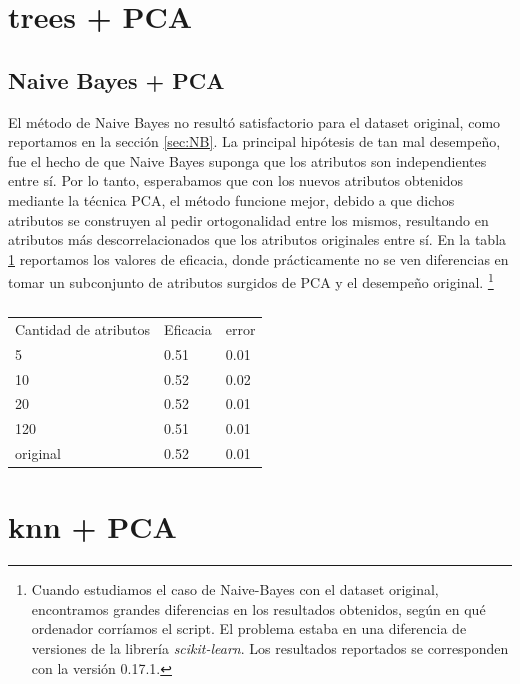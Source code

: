 \documentclass[a4paper,10pt]{article}
\begin{document}
\section{trees + PCA}



\subsection{Naive Bayes + PCA}\label{sec:NB_PCA}

\par El método de Naive Bayes no resultó satisfactorio para el dataset original, como reportamos en la sección \ref{sec:NB}. La principal hipótesis de tan mal desempeño, fue el hecho de que Naive Bayes suponga que los atributos son independientes entre sí. Por lo tanto, esperabamos que con los nuevos atributos obtenidos mediante la técnica PCA, el método funcione mejor, debido a que dichos atributos se construyen al pedir ortogonalidad entre los mismos, resultando en atributos más descorrelacionados que los atributos originales entre sí. En la tabla \ref{table:NB} reportamos los valores de eficacia, donde prácticamente no se ven diferencias en tomar un subconjunto de atributos surgidos de PCA y el desempeño original. \footnote{Cuando estudiamos el caso de Naive-Bayes con el dataset original, encontramos grandes diferencias en los resultados obtenidos, según en qué ordenador corríamos el script. El problema estaba en una diferencia de versiones de la librería \emph{scikit-learn}. Los resultados reportados se corresponden con la versión 0.17.1.}

\begin{table}
\centering
\caption{}
\label{table:NB}
\begin{tabular}{lll}
Cantidad de atributos & Eficacia & error \\
5 & 0.51 & 0.01 \\
10 & 0.52 & 0.02 \\
20 & 0.52 & 0.01 \\
120 & 0.51 & 0.01 \\
original & 0.52 & 0.01 \\
\end{tabular}
\end{table}

\section{knn + PCA}
\end{document}

